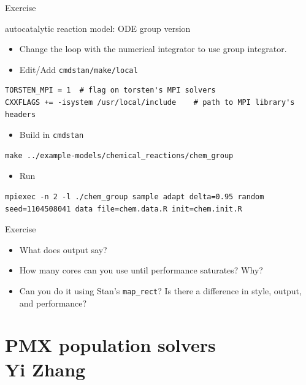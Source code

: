 \documentclass[presentation]{beamer}
\begin{document}
\begin{frame}[fragile,label={sec:org87e98d6}]{Exercise}
 \begin{block}{autocatalytic reaction model: ODE group version}
\begin{itemize}
\item Change the loop with the numerical integrator to use group
integrator.

\item Edit/Add \texttt{cmdstan/make/local}
\end{itemize}
\begin{verbatim}
TORSTEN_MPI = 1  # flag on torsten's MPI solvers
CXXFLAGS += -isystem /usr/local/include    # path to MPI library's headers
\end{verbatim}
\begin{itemize}
\item Build in \texttt{cmdstan}
\end{itemize}
\begin{verbatim}
make ../example-models/chemical_reactions/chem_group
\end{verbatim}
\begin{itemize}
\item Run
\end{itemize}
\begin{verbatim}
mpiexec -n 2 -l ./chem_group sample adapt delta=0.95 random seed=1104508041 data file=chem.data.R init=chem.init.R
\end{verbatim}
\end{block}
\end{frame}

\begin{frame}[fragile,label={sec:orgac4f031}]{Exercise}
 \begin{itemize}
\item What does output say?
\item How many cores can you use until performance saturates? Why?
\item Can you do it using Stan's \texttt{map\_rect}? Is there a
difference in style, output, and performance?
\end{itemize}
\end{frame}

\section{PMX population solvers \\ \footnotesize{Yi Zhang}}
\label{sec:orgb5536b6}
\end{document}
